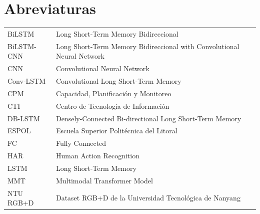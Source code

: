 \chapter{Abreviaturas}
\renewcommand{\arraystretch}{2}
\begin{table}[htbp]
\begin{tabular}{ll}
BiLSTM          & Long Short-Term Memory Bidireccional \\
BiLSTM-CNN      & Long Short-Term Memory Bidireccional with Convolutional Neural Network \\
CNN             & Convolutional Neural Network\\
Conv-LSTM       & Convolutional Long Short-Term Memory\\
CPM             & Capacidad, Planificación y Monitoreo\\
CTI             & Centro de Tecnolog\'ia de Informaci\'on\\
DB-LSTM         & Densely-Connected Bi-directional Long Short-Term Memory\\
ESPOL           & Escuela Superior Polit\'ecnica del Litoral \\
FC              & Fully Connected \\
HAR             & Human Action Recognition\\
LSTM            & Long Short-Term Memory\\
MMT             & Multimodal Transformer Model\\
NTU RGB+D       & Dataset RGB+D de la Universidad Tecnológica de Nanyang \\
\end{tabular}
\end{table}

\newpage